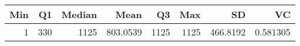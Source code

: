 
\begin{tabular}[t]{rrrrrrrr}
\toprule
Min & Q1 & Median & Mean & Q3 & Max & SD & VC\\
\midrule
1 & 330 & 1125 & 803.0539 & 1125 & 1125 & 466.8192 & 0.581305\\
\bottomrule
\end{tabular}